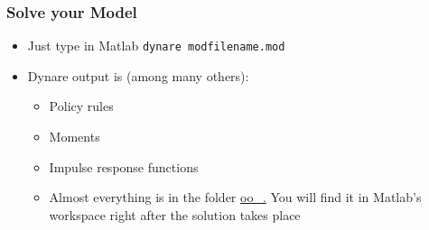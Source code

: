 \documentclass[xcolor=dvipsnames,handout,aspectratio=169]{beamer}
\begin{document}
\begin{frame}[t]\frametitle{\textbf{Solve your Model}}
  \begin{itemize}
  \setlength\itemsep{1em}
  \item Just type in Matlab \texttt{dynare modfilename.mod} 
  \item Dynare output is (among many others):
  \begin{itemize}
      \setlength\itemsep{1em}
    \item Policy rules
    \item Moments 
    \item Impulse response functions
    \item Almost everything is in the folder  \url{oo\_.} You will find it in Matlab's workspace right after the solution takes place
  \end{itemize}
 \end{itemize}
\end{frame}






 
\end{document}
